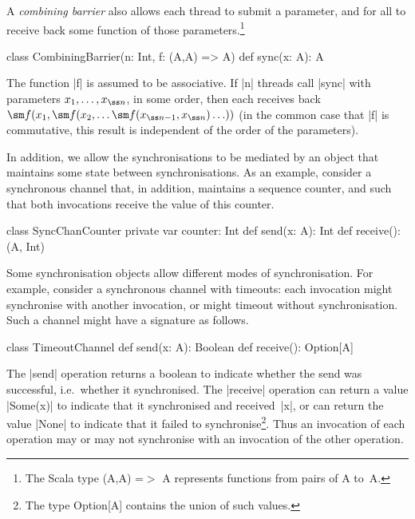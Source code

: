 A \emph{combining barrier} also allows each thread to submit a parameter, and
for all to receive back some function of those parameters.\footnote{The Scala
  type {\scalastyle (A,A) =}$>$ {\scalastyle A} represents functions from
  pairs of {\scalastyle A} to~{\scalastyle A}.}
%
\begin{scala}
class CombiningBarrier(n: Int, f: (A,A) => A){
  def sync(x: A): A
}
\end{scala}
%
The function |f| is assumed to be associative.  If |n| threads call |sync|
with parameters $x_1, \ldots, x_{\ss n}$, in some order, then each receives
back $\sm f(x_1, \sm f(x_2, \ldots \sm f(x_{{\ss n}-1}, x_{\ss n}) \ldots ))$
(in the common case that |f| is commutative, this result is independent of the
order of the parameters).

In addition, we allow the synchronisations to be mediated by an object that
maintains some state between synchronisations.  As an example, consider a
synchronous channel that, in addition, maintains a sequence counter, and such
that both invocations receive the value of this counter.
\begin{scala}
class SyncChanCounter{
  private var counter: Int
  def send(x: A): Int
  def receive(): (A, Int)
}
\end{scala}



Some synchronisation objects allow different modes of synchronisation.  For
example, consider a synchronous channel with timeouts: each invocation might
synchronise with another invocation, or might timeout without
synchronisation.  Such a channel might have a signature as follows.
%
\begin{scala}
class TimeoutChannel{
  def send(x: A): Boolean
  def receive(): Option[A]
}
\end{scala}
%
The |send| operation returns a boolean to indicate whether the send was
successful, i.e.~whether it synchronised.  The |receive| operation can return
a value |Some(x)| to indicate that it synchronised and received~|x|, or can
return the value |None| to indicate that it failed to synchronise\footnote{The
  type {\scalashape Option[A]} contains the union of such values.}.  Thus an
invocation of each operation may or may not synchronise with an invocation of
the other operation. 

